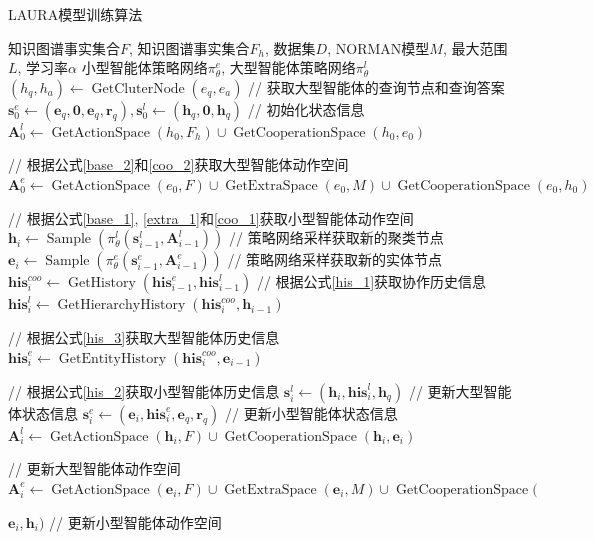 \documentclass[algorithmlist, AutoFakeBold, AutoFakeSlant, figurelist, tablelist, nomlist, engineering, openany]{seuthesix} %
\begin{document}
\begin{algorithm}[H]
	\caption{LAURA模型训练算法}  
	\label{algorithm_dualagent}
	\begin{algorithmic}[1]
  \Require 知识图谱事实集合$F$, 知识图谱事实集合$F_h$, 数据集$D$, NORMAN模型$M$, 最大范围$L$, 学习率$\alpha$
  \Ensure 小型智能体策略网络$\pi_\theta^e$, 大型智能体策略网络$\pi_\theta^l$
  \State $(h_q, h_a) \leftarrow \operatorname{GetCluterNode}(e_q, e_a)$ // 获取大型智能体的查询节点和查询答案
  \State $\bm{s}_{0}^{e} \leftarrow (\bm{e}_q, \bm{0}, \bm{e}_q, \bm{r}_q), \bm{s}_{0}^{l} \leftarrow (\bm{h}_q, \bm{0}, \bm{h}_q)$ // 初始化状态信息
  \State $\bm{A}_{0}^{l} \leftarrow \operatorname{GetActionSpace}(h_0, F_h) \cup \operatorname{GetCooperationSpace}(h_0, e_0)$ \par\quad// 根据公式\ref{base_2}和\ref{coo_2}获取大型智能体动作空间
  \State $\bm{A}_{0}^{e} \leftarrow \operatorname{GetActionSpace}(e_0, F) \cup \operatorname{GetExtraSpace}(e_0, M) \cup \operatorname{GetCooperationSpace}(e_0, h_0)$ \par\quad// 根据公式\ref{base_1}, \ref{extra_1}和\ref{coo_1}获取小型智能体动作空间
  \State $\bm{h}_i \leftarrow \operatorname{Sample}(\pi_\theta^l(\bm{s}_{i-1}^{l}, \bm{A}_{i-1}^{l}))$ // 策略网络采样获取新的聚类节点
  \State $\bm{e}_i \leftarrow \operatorname{Sample}(\pi_\theta^e(\bm{s}_{i-1}^{e}, \bm{A}_{i-1}^{e}))$ // 策略网络采样获取新的实体节点
  \State $\bm{his}_{i}^{coo} \leftarrow \operatorname{GetHistory}(\bm{his}_{i-1}^{e}, \bm{his}_{i-1}^{l})$ // 根据公式\ref{his_1}获取协作历史信息
  \State $\bm{his}_{i}^{l} \leftarrow \operatorname{GetHierarchyHistory}(\bm{his}_{i}^{coo}, \bm{h}_{i-1})$ \par\quad\quad // 根据公式\ref{his_3}获取大型智能体历史信息
  \State $\bm{his}_{i}^{e} \leftarrow \operatorname{GetEntityHistory}(\bm{his}_{i}^{coo}, \bm{e}_{i-1})$ \par\quad\quad // 根据公式\ref{his_2}获取小型智能体历史信息
  \State $\bm{s}_{i}^{l} \leftarrow (\bm{h}_{i}, \bm{his}_{i}^{l}, \bm{h}_q)$ // 更新大型智能体状态信息
  \State $\bm{s}_{i}^{e} \leftarrow (\bm{e}_{i}, \bm{his}_{i}^{e}, \bm{e}_q, \bm{r}_q)$ // 更新小型智能体状态信息
  \State $\bm{A}_{i}^{l} \leftarrow \operatorname{GetActionSpace}(\bm{h}_i, F) \cup \operatorname{GetCooperationSpace}(\bm{h}_i, \bm{e}_i)$ \par\quad\quad// 更新大型智能体动作空间
  \State $\bm{A}_{i}^{e} \leftarrow \operatorname{GetActionSpace}(\bm{e}_i, F) \cup \operatorname{GetExtraSpace}(\bm{e}_i, M) \cup \operatorname{GetCooperationSpace}($\par\quad\quad$\bm{e}_i, \bm{h}_i)$ // 更新小型智能体动作空间

\end{algorithmic}
\end{algorithm}
\end{document}

